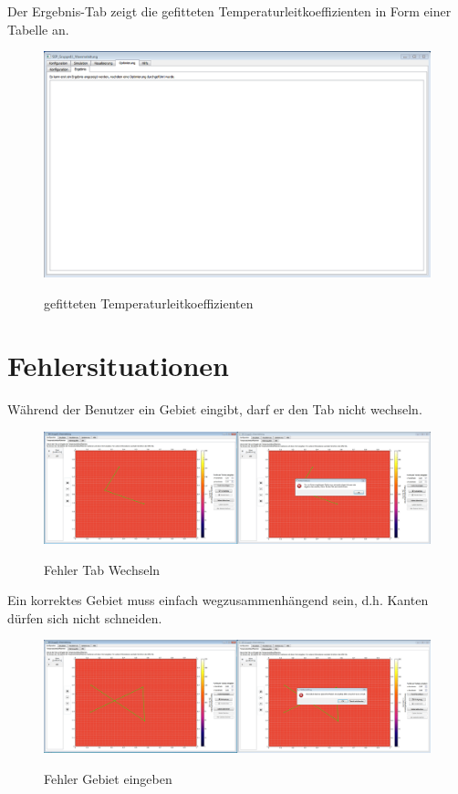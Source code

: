 Der Ergebnis-Tab zeigt die gefitteten Temperaturleitkoeffizienten in Form einer Tabelle an.
\begin{figure}[H]
\centering
\includegraphics[scale=.25]{Bilder/ErgebnisAnzeigen.png}\\
\caption{gefitteten Temperaturleitkoeffizienten}
\label{ErgebnisAnzeigen}
\end{figure}



\newpage
\section{Fehlersituationen}

Während der Benutzer ein Gebiet eingibt, darf er den Tab nicht wechseln.
\begin{figure}[H]
\centering
\includegraphics[scale=.25]{Bilder/FehlerTabWechseln.png}\\
\caption{Fehler Tab Wechseln}
\label{FehlerTabWechseln}
\end{figure}

\noindent
Ein korrektes Gebiet muss einfach wegzusammenhängend sein, d.h. Kanten dürfen sich nicht schneiden.
\begin{figure}[H]
\centering
\includegraphics[scale=.25]{Bilder/FehlerGebietEingeben.png}\\
\caption{Fehler Gebiet eingeben}
\label{FehlerGebietEingeben}
\end{figure}
